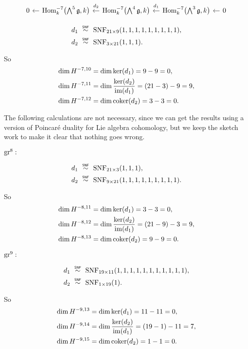 \[
  \begin{tikzcd}[column sep=1em]
    0 & \ar[l] \Hom_{k}^{-7}\bigl( \bigwedge^{5}\lie{g}, k \bigr) & \ar[l,"d_{2}"' {yshift=2pt}] \Hom_{k}^{-7}\bigl( \bigwedge^{4}\lie{g}, k \bigr) & \ar[l,"d_{1}"' {yshift=2pt}] \Hom_{k}^{-7}\bigl( \bigwedge^{3}\lie{g}, k \bigr) & \ar[l] 0
  \end{tikzcd}
\]

\begin{align*}
  d_{1} &\snfsim \SNF_{21\times9}(1,1,1,1,1,1,1,1,1), \\
  d_{2} &\snfsim \SNF_{3\times21}(1,1,1).
\end{align*}

So
\begin{align*}
  \dim H^{-7,10} &= \dim \operatorname{ker}(d_{1}) = 9-9 = 0, \\
  \dim H^{-7,11} &= \dim \dfrac{\operatorname{ker}(d_{2})}{\operatorname{im}(d_{1})} = (21-3) - 9 = 9, \\
  \dim H^{-7,12} &= \dim \operatorname{coker}(d_{2}) = 3 - 3 = 0.
\end{align*}

The following calculations are not necessary, since we can get the results using a version of Poincaré duality for Lie algebra cohomology, but we keep the sketch work to make it clear that nothing goes wrong.

$\operatorname{gr}^{8}:$

\begin{align*}
  d_{1} &\snfsim \SNF_{21\times3}(1,1,1), \\
  d_{2} &\snfsim \SNF_{9\times21}(1,1,1,1,1,1,1,1,1).
\end{align*}

So
\begin{align*}
  \dim H^{-8,11} &= \dim \operatorname{ker}(d_{1}) = 3-3 = 0, \\
  \dim H^{-8,12} &= \dim \dfrac{\operatorname{ker}(d_{2})}{\operatorname{im}(d_{1})} = (21-9) - 3 = 9, \\
  \dim H^{-8,13} &= \dim \operatorname{coker}(d_{2}) = 9 - 9 = 0.
\end{align*}


$\operatorname{gr}^{9}:$

\begin{align*}
  d_{1} &\snfsim \SNF_{19\times11}(1,1,1,1,1,1,1,1,1,1,1), \\
  d_{2} &\snfsim \SNF_{1\times19}(1).
\end{align*}

So
\begin{align*}
  \dim H^{-9,13} &= \dim \operatorname{ker}(d_{1}) = 11-11 = 0, \\
  \dim H^{-9,14} &= \dim \dfrac{\operatorname{ker}(d_{2})}{\operatorname{im}(d_{1})} = (19-1) - 11 = 7, \\
  \dim H^{-9,15} &= \dim \operatorname{coker}(d_{2}) = 1 - 1 = 0.
\end{align*}

